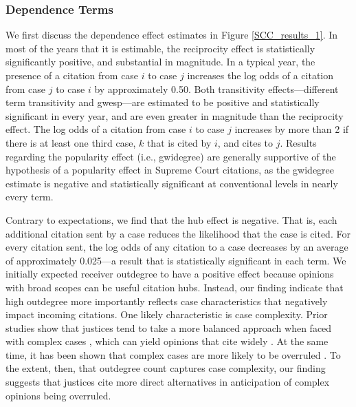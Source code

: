 \documentclass[headsepline=true, abstracton]{scrartcl}
\begin{document}
\subsubsection{Dependence Terms}
We first discuss the dependence effect estimates in Figure \ref{SCC_results_1}. In most of the years that it is estimable, the reciprocity effect is statistically significantly positive, and substantial in magnitude. In a typical year, the presence of a citation from case $i$ to case $j$ increases the log odds of a citation from case $j$ to case $i$ by approximately 0.50. Both transitivity effects---different term transitivity and gwesp---are estimated to be positive and statistically significant in every year, and are even greater in magnitude than the reciprocity effect. The log odds of a citation from case $i$ to case $j$ increases by more than 2 if there is at least one third case, $k$ that is cited by $i$, and cites to $j$. Results regarding the popularity effect (i.e., gwidegree) are generally supportive of the hypothesis of a popularity effect in Supreme Court citations, as the gwidegree estimate is negative and statistically significant at conventional levels in nearly every term.

Contrary to expectations, we find that the hub effect is negative. That is, each additional citation sent by a case reduces the likelihood that the case is cited. For every citation sent, the log odds of any citation to a case decreases by an average of approximately 0.025---a result that is statistically significant in each term. We initially expected receiver outdegree to have a positive effect because opinions with broad scopes can be useful citation hubs. Instead, our finding indicate that high outdegree more importantly reflects case characteristics that negatively impact incoming citations. One likely characteristic is case complexity. Prior studies show that justices tend to take a more balanced approach when faced with complex cases \citep{collins2008amici, lindquist2007splitting}, which can yield opinions that cite widely \citep{wilkinson2005rehnquist}. At the same time, it has been shown that complex cases are more likely to be overruled \citep{spriggs2001explaining}. To the extent, then, that outdegree count captures case complexity, our finding suggests that justices cite more direct alternatives in anticipation of complex opinions being overruled.
\end{document}
